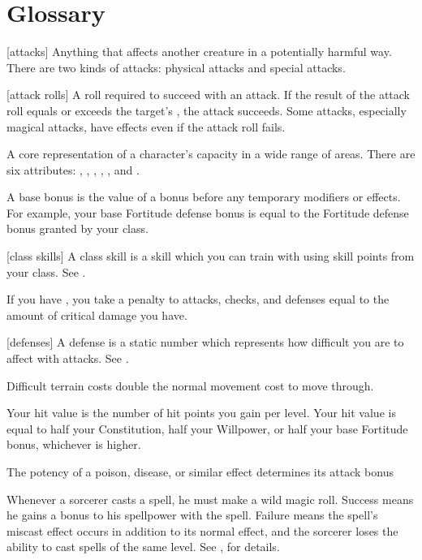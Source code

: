 \chapter{Glossary}\label{Glossary}

[attacks] Anything that affects another creature in a potentially harmful way. There are two kinds of attacks: physical attacks and special attacks.

[attack rolls] A roll required to succeed with an attack. If the result of the attack roll equals or exceeds the target's , the attack succeeds. Some attacks, especially magical attacks, have effects even if the attack roll fails.

 A core representation of a character's capacity in a wide range of areas. There are six attributes: , , , , , and .

 A base bonus is the value of a bonus before any temporary modifiers or effects. For example, your base Fortitude defense bonus is equal to the Fortitude defense bonus granted by your class.

[class skills] A class skill is a skill which you can train with using skill points from your class. See .

 If you have , you take a penalty to attacks, checks, and defenses equal to the amount of critical damage you have.

[defenses] A defense is a static number which represents how difficult you are to affect with attacks. See .

 Difficult terrain costs double the normal movement cost to move through.

 Your hit value is the number of hit points you gain per level. Your hit value is equal to half your Constitution, half your Willpower, or half your base Fortitude bonus, whichever is higher.

 The potency of a poison, disease, or similar effect determines its attack bonus

 Whenever a sorcerer casts a spell, he must make a wild magic roll.
Success means he gains a bonus to his spellpower with the spell.
Failure means the spell's miscast effect occurs in addition to its normal effect, and the sorcerer loses the ability to cast spells of the same level.
See , for details.

